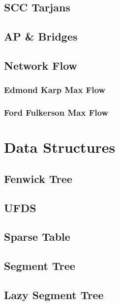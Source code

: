 \documentclass[twocolumn]{article}
\begin{document}
    \subsection{SCC Tarjans}
    

    \subsection{AP \& Bridges}
    

    \subsection{Network Flow}
        \subsubsection{Edmond Karp Max Flow}
        
        \subsubsection{Ford Fulkerson Max Flow}
        

    \newpage
    \section{Data Structures}
        \subsection{Fenwick Tree}
        
        \subsection{UFDS}
        
        \subsection{Sparse Table}
        
        \subsection{Segment Tree}
        
        \subsection{Lazy Segment Tree}
        
\end{document}

